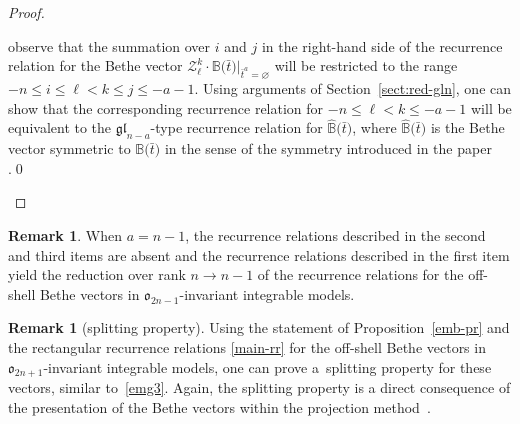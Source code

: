 \documentclass[10pt,a4paper]{amsart}
\newcommand{\bt}{{\bar t}}
\theoremstyle{definition}
\newtheorem{rem}[thm]{Remark}
\def\BB{{\mathbb{B}}}
\def\hBB{\hat{\mathbb{B}}}
\def\r#1{\eqref{#1}}
\def\Z{\mathcal{Z}}
\begin{document}
\begin{proof}
\begin{itemize}
observe that the summation over $i$ and $j$ in the right-hand side of the recurrence relation
for the Bethe vector $\Z^k_\ell\cdot
\BB\bigl(\bt\bigr)|_{\bt^a=\varnothing}$ will be restricted to the range
$-n\leq i\leq \ell<k\leq j\leq -a-1$. Using arguments of Section~\ref{sect:red-gln},
one can show that the corresponding
recurrence relation for $-n\leq \ell< k\leq -a-1$ will be equivalent to
the $\mathfrak{gl}_{n-a}$-type recurrence relation for
$\hBB\bigl(\bt\bigr)$, where $\hat\BB\bigl(\bt\bigr)$ is the Bethe vector symmetric
to $\BB\bigl(\bt\bigr)$
in the sense of the symmetry introduced in the paper \cite{LPRS-New}.\hfill \qed
\end{itemize}\renewcommand{\qed}{}
\end{proof}
\begin{rem}
When $a=n-1$, the recurrence relations described in the second and third
items are absent and the recurrence relations described in the first item
yield the reduction over rank $n\to n-1$ of the recurrence relations for the
off-shell Bethe vectors in $\mathfrak{o}_{2n-1}$-invariant integrable models.
\end{rem}

\begin{rem}[splitting property]
Using the statement of Proposition~\ref{emb-pr} and
the rectangular recurrence relations \r{main-rr} for the
off-shell Bethe vectors in $\mathfrak{o}_{2n+1}$-invariant
integrable models, one can prove a~splitting
property for these vectors, similar to~\r{emg3}. Again, the splitting property
is a direct consequence of the presentation of the Bethe vectors within
the projection method~\cite{LP2}.
\end{rem}
\end{document}
